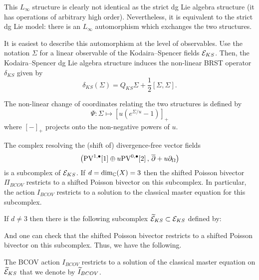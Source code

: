 \documentclass[11pt]{amsart}
\begin{document}
This $L_\infty$ structure is clearly not identical as the strict dg Lie algebra structure (it has operations of arbitrary high order). 
Nevertheless, it is equivalent to the strict dg Lie model: there is an $L_\infty$ automorphism which exchanges the two structures.

It is easiest to describe this automorphism at the level of observables.
Use the notation $\Sigma$ for a linear observable of the Kodaira--Spencer fields $\mathcal E_{KS}$. 
Then, the Kodaira--Spencer dg Lie algebra structure induces the non-linear BRST operator $\delta_{KS}$ given by
\[
\delta_{KS} (\Sigma) = Q_{KS} \Sigma + \frac12 [\Sigma,\Sigma] .
\]

The non-linear change of coordinates relating the two structures is defined by
\[
\Psi \colon \Sigma \mapsto \left[u (e^{\Sigma/u} -1)\right]_+
\]
where $[-]_+$ projects onto the non-negative powers of $u$.  

\parsec[]

The complex resolving the (shift of) divergence-free vector fields 
\[
\left({\rm PV}^{1,\bullet}[1] \oplus u {\rm PV}^{0,\bullet}[2] \, , \, \overline{\partial} + u \partial_{\Omega}\right) 
\]
is a subcomplex of $\mathcal E_{KS}$.
If $d = \dim_\mathbb C(X)=3$ then the shifted Poisson bivector $\Pi_{BCOV}$ restricts to a shifted Poisson bivector on this subcomplex. 
In particular, the action $I_{BCOV}$ restricts to a solution to the classical master equation for this subcomplex. 

If $d \ne 3$ then there is the following subcomplex $\widetilde{\mathcal E}_{KS}\subset \mathcal E_{KS}$ defined by:
\beqn\label{eqn:tilks}
\eeqn
And one can check that the shifted Poisson bivector restricts to a shifted Poisson bivector on this subcomplex. 
Thus, we have the following.

\begin{prop}
\label{prop:tilbcov}
The BCOV action $I_{BCOV}$ restricts to a solution of the classical master equation on $\widetilde{\mathcal E}_{KS}$ that we denote by $\widetilde{I}_{BCOV}$. 
\end{prop}
\end{document}
